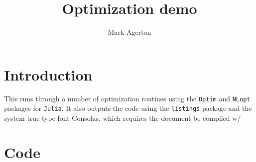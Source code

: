 \documentclass{article}
\author{Mark Agerton}
\title{Optimization demo}
\begin{document}
\maketitle

\section{Introduction}

This runs through a number of optimization routines using the \verb+Optim+ and \verb+NLopt+ packages for \verb+Julia+. It also outputs the code using the \verb+listings+ package and the system true-type font Consolas, which requires the document be compiled w/ \XeLaTeX

\section{Code}



\clearpage

\end{document}
